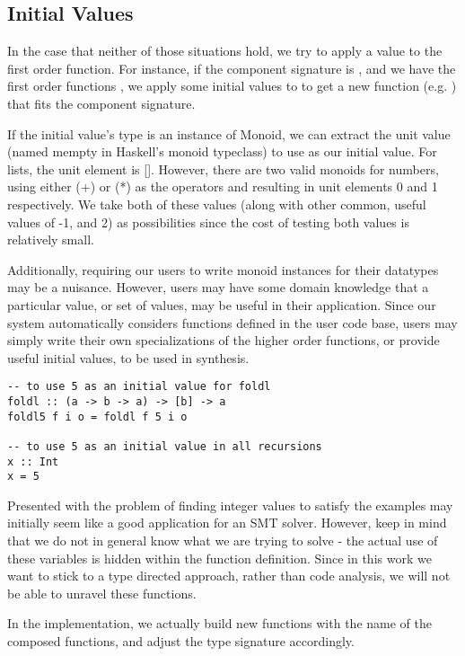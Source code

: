 \subsection{Initial Values}
In the case that neither of those situations hold, we try to apply a value to the first order function.
For instance, if the component signature is , and we have the first order functions , we apply some initial values to \codeinline{(+)} to get a new function (e.g. ) that fits the component signature.

If the initial value's type is an instance of Monoid, we can extract the unit value (named mempty in Haskell's monoid typeclass\cite{monoid}) to use as our initial value. For lists, the unit element is []. However, there are two valid monoids for numbers, using either (+) or (*) as the operators and resulting in unit elements 0 and 1 respectively. We take both of these values (along with other common, useful values of -1, and 2) as possibilities since the cost of testing both values is relatively small.

Additionally, requiring our users to write monoid instances for their datatypes may be a nuisance. However, users may have some domain knowledge that a particular value, or set of values, may be useful in their application. Since our system automatically considers functions defined in the user code base, users may simply write their own specializations of the higher order functions, or provide useful initial values, to be used in synthesis. 

\begin{lstlisting}
-- to use 5 as an initial value for foldl
foldl :: (a -> b -> a) -> [b] -> a
foldl5 f i o = foldl f 5 i o

-- to use 5 as an initial value in all recursions
x :: Int
x = 5
\end{lstlisting}

Presented with the problem of finding integer values to satisfy the examples may initially seem like a good application for an SMT solver. However, keep in mind that we do not in general know what we are trying to solve - the actual use of these variables is hidden within the function definition. Since in this work we want to stick to a type directed approach, rather than code analysis, we will not be able to unravel these functions.

In the implementation, we actually build new functions with the name of the composed functions, and adjust the type signature accordingly.

